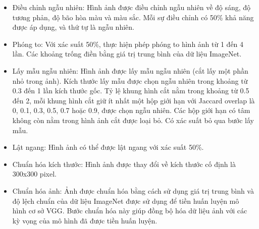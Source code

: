 \documentclass[a4paper]{article}
\begin{document}
\begin{itemize}
	\item Điều chỉnh ngẫu nhiên: Hình ảnh được điều chỉnh ngẫu nhiên về độ sáng, độ tương phản, độ bão hòa màu và màu sắc. Mỗi sự điều chỉnh có 50\% khả năng được áp dụng, và thứ tự là ngẫu nhiên.
	
	\item Phóng to: Với xác suất 50\%, thực hiện phép phóng to hình ảnh từ 1 đến 4 lần. Các khoảng trống điền bằng giá trị trung bình của dữ liệu ImageNet.
	
	\item Lấy mẫu ngẫu nhiên: Hình ảnh được lấy mẫu ngẫu nhiên (cắt lấy một phần nhỏ trong ảnh). Kích thước lấy mẫu được chọn ngẫu nhiên trong khoảng từ 0.3 đến 1 lần kích thước gốc. Tỷ lệ khung hình cắt nằm trong khoảng từ 0.5 đến 2, mỗi khung hình cắt giữ ít nhất một hộp giới hạn với Jaccard overlap là 0, 0.1, 0.3, 0.5, 0.7 hoặc 0.9, được chọn ngẫu nhiên. Các hộp giới hạn có tâm không còn nằm trong hình ảnh cắt được loại bỏ. Có xác suất bỏ qua bước lấy mẫu.
	
	\item Lật ngang: Hình ảnh có thể được lật ngang với xác suất 50\%.
	
	\item Chuẩn hóa kích thước: Hình ảnh được thay đổi về kích thước cố định là 300x300 pixel.
	
	\item Chuẩn hóa ảnh: Ảnh được chuẩn hóa bằng cách sử dụng giá trị trung bình và độ lệch chuẩn của dữ liệu ImageNet được sử dụng để tiền huấn luyện mô hình cơ sở VGG. Bước chuẩn hóa này giúp đồng bộ hóa dữ liệu ảnh với các kỳ vọng của mô hình đã được tiền huấn luyện.
\end{itemize}
\end{document}
